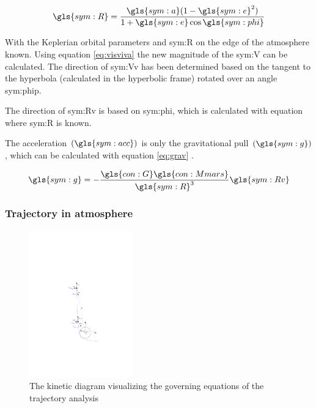 \begin{equation}
\gls{sym:R} = \frac{\gls{sym:a}(1-\gls{sym:e}^2)}{1+\gls{sym:e}\cos{\gls{sym:phi}}}
\label{eq:polarkep}
\end{equation}

With the Keplerian orbital parameters and \gls{sym:R} on the edge of the atmosphere known. Using equation \ref{eq:visviva} the new magnitude of the \gls{sym:V} can be calculated. The direction of \gls{sym:Vv} has been determined based on the tangent to the hyperbola (calculated in the hyperbolic frame) rotated over an angle \gls{sym:phip}.

The direction of \gls{sym:Rv} is based on \gls{sym:phi}, which is calculated with equation \label{eq:polarkep} where \gls{sym:R} is known.

The acceleration $\left(\gls{sym:acc}\right)$ is only the gravitational pull $\left(\gls{sym:g}\right)$, which can be calculated with equation \ref{eq:grav} \cite{Weiland2004}.

\begin{equation} \label{eq:grav}
\gls{sym:g} = -\frac{\gls{con:G}\gls{con:Mmars}}
					{\gls{sym:R}^3}\gls{sym:Rv}
\end{equation}

\subsubsection{Trajectory in atmosphere}
 \label{sec:trajatmos}
 
\begin{figure}
		\centering
		\includegraphics[width = 0.4\textwidth]{Figure/orbital_mechanics.pdf}
		\caption{The kinetic diagram visualizing the governing equations of the trajectory analysis}
		\label{fig:orb}
\end{figure}

